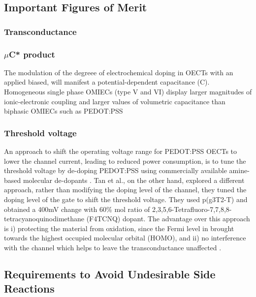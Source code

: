 \subsection{Important Figures of Merit}

\subsubsection{Transconductance}

\subsubsection{$\mu$C* product}


The modulation of the degreee of electrochemical doping in OECTs with an applied biased, will manifest a potential-dependent capacitance (C). Homogeneous single phase OMIECs (type V and VI) display larger magnitudes of ionic-electronic coupling and larger values of volumetric capacitance than biphasic OMIECs such as PEDOT:PSS \cite{inalBenchmarkingOrganicMixed2017}

\subsubsection{Threshold voltage}

An approach to shift the operating voltage range for PEDOT:PSS OECTs to lower the channel current, leading to reduced power consumption, is to tune the threshold voltage by de-doping PEDOT:PSS using commercially available amine-based molecular de-dopants \cite{keeneEnhancementModePEDOTPSS2020}. Tan et al., on the other hand, explored a different approach, rather than modifying the doping level of the channel, they tuned the doping level of the gate to shift the threshold voltage. They used p(g3T2-T) and obtained a 400mV change with 60\% mol ratio of 2,3,5,6-Tetrafluoro-7,7,8,8-tetracyanoquinodimethane (F4TCNQ) dopant. The advantage over this approach is i) protecting the material from oxidation, since the Fermi level in brought towards the highest occupied molecular orbital (HOMO), and ii) no interference with the channel which helps to leave the transconductance unaffected \cite{tanTuningOrganicElectrochemical2022}.


{\subsection{Requirements to Avoid Undesirable Side Reactions}}
\label{subsec:req}

